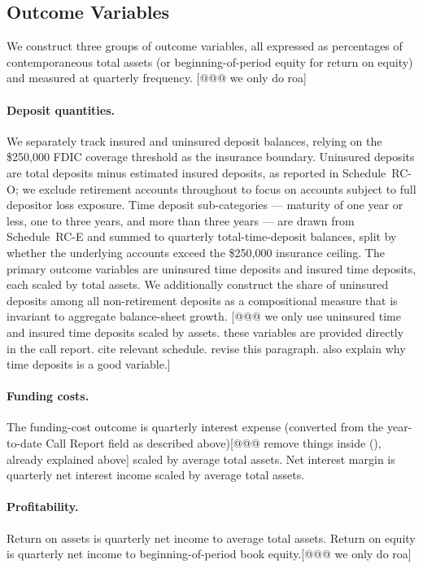 \subsection{Outcome Variables}
\label{sec:data:outcomes}

We construct three groups of outcome variables, all expressed as percentages
of contemporaneous total assets (or beginning-of-period equity for
return on equity) and measured at quarterly frequency. [@@@ we only do roa]

\paragraph{Deposit quantities.}
We separately track insured and uninsured deposit balances, relying on the
\$250,000 FDIC coverage threshold as the insurance boundary. Uninsured deposits
are total deposits minus estimated insured deposits, as reported in
Schedule~RC-O; we exclude retirement accounts throughout to focus on accounts
subject to full depositor loss exposure. Time deposit sub-categories --- maturity
of one year or less, one to three years, and more than three years --- are
drawn from Schedule~RC-E and summed to quarterly total-time-deposit balances,
split by whether the underlying accounts exceed the \$250,000 insurance ceiling.
The primary outcome variables are uninsured time deposits and insured time
deposits, each scaled by total assets. We additionally construct the share of
uninsured deposits among all non-retirement deposits as a compositional measure
that is invariant to aggregate balance-sheet growth. [@@@ we only use uninsured time and insured time deposits scaled by assets. these variables are provided directly in the call report. cite relevant schedule. revise this paragraph. also explain why time deposits is a good variable.]

\paragraph{Funding costs.}
The funding-cost outcome is quarterly interest expense (converted from the
year-to-date Call Report field as described above)[@@@ remove things inside (), already explained above] scaled by average total
assets. Net interest margin is quarterly net interest income scaled by average
total assets.

\paragraph{Profitability.}
Return on assets is quarterly net income to average total assets. Return on
equity is quarterly net income to beginning-of-period book equity.[@@@ we only do roa]

